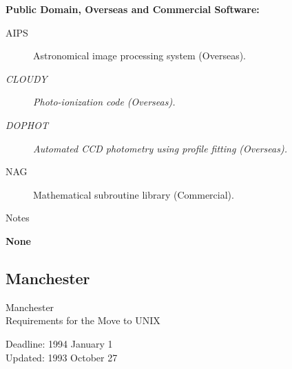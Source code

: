 \newpage
\vspace{5mm}
\begin{center}
{\bf Public Domain, Overseas and Commercial Software:}
\end{center}

\begin{description}
\item[AIPS] Astronomical image processing system (Overseas).
\item[{\em CLOUDY}] {\em Photo-ionization code (Overseas).}
\item[{\em DOPHOT}] {\em Automated CCD photometry using profile fitting 
(Overseas).}
\item[NAG] Mathematical subroutine library (Commercial).
\end{description}


\vspace{5mm}
\begin{center}
{\large\sc Notes}
\end{center}

{\bf None}


\newpage
\subsection{Manchester}

\renewcommand{\starsitename}{Manchester}
\renewcommand{\starnodename}{MAVAD}

\renewcommand{\starunixdate}{1994 January 1}
\renewcommand{\starupdate}{1993 October 27}

\renewcommand{\starsitetelephone}{061 275 4236}
\renewcommand{\starsitefax}{061 273 4223}

\begin{center}
{\Large\sc \starsitename \\ [2ex]
           Requirements for the Move to UNIX}

\vspace{3mm}
{\large\sc Deadline: \starunixdate \\ [1ex]
           Updated: \starupdate}
\end{center}

\vspace{5mm}

